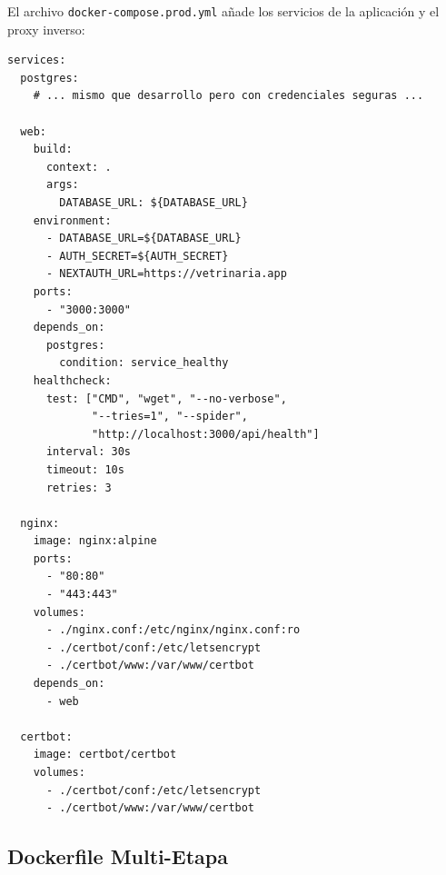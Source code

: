 El archivo \texttt{docker-compose.prod.yml} a\~nade los servicios de la
aplicaci\'on y el proxy inverso:

\begin{lstlisting}[style=yaml, caption=docker-compose.prod.yml (servicios adicionales)]
services:
  postgres:
    # ... mismo que desarrollo pero con credenciales seguras ...

  web:
    build:
      context: .
      args:
        DATABASE_URL: ${DATABASE_URL}
    environment:
      - DATABASE_URL=${DATABASE_URL}
      - AUTH_SECRET=${AUTH_SECRET}
      - NEXTAUTH_URL=https://vetrinaria.app
    ports:
      - "3000:3000"
    depends_on:
      postgres:
        condition: service_healthy
    healthcheck:
      test: ["CMD", "wget", "--no-verbose",
             "--tries=1", "--spider",
             "http://localhost:3000/api/health"]
      interval: 30s
      timeout: 10s
      retries: 3

  nginx:
    image: nginx:alpine
    ports:
      - "80:80"
      - "443:443"
    volumes:
      - ./nginx.conf:/etc/nginx/nginx.conf:ro
      - ./certbot/conf:/etc/letsencrypt
      - ./certbot/www:/var/www/certbot
    depends_on:
      - web

  certbot:
    image: certbot/certbot
    volumes:
      - ./certbot/conf:/etc/letsencrypt
      - ./certbot/www:/var/www/certbot
\end{lstlisting}

\subsection{Dockerfile Multi-Etapa}

